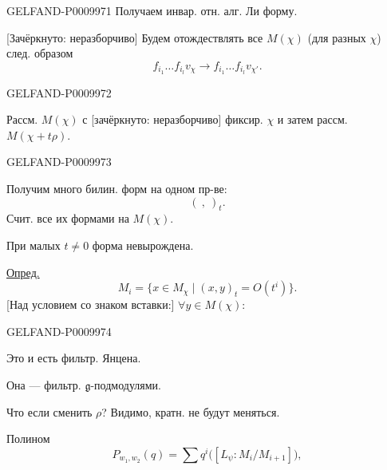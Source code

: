 \begin{GelfandAdjacentEvidence}{GELFAND-P000997}{1}
Получаем инвар. отн. алг. Ли форму.

[Зачёркнуто: неразборчиво] Будем отождествлять все $M(\chi)$ (для разных $\chi$) след. образом
\[
f_{i_1}\ldots f_{i_l}v_\chi
\longrightarrow f_{i_1}\ldots f_{i_l}v_{\chi'}.
\]
\end{GelfandAdjacentEvidence}
\begin{GelfandAdjacentEvidence}{GELFAND-P000997}{2}


Рассм. $M(\chi)$ с [зачёркнуто: неразборчиво] фиксир. $\chi$ и затем рассм. $M(\chi+t\rho)$.
\end{GelfandAdjacentEvidence}
\begin{GelfandAdjacentEvidence}{GELFAND-P000997}{3}


Получим много билин. форм на одном пр-ве:
\[
(\ ,\ )_t.
\]
Счит. все их формами на $M(\chi)$.

При малых $t\ne0$ форма невырождена.

\underline{Опред.}
\[
M_i=\{x\in M_\chi\mid (x,y)_t=O(t^i)\}.
\]
[Над условием со знаком вставки:] $\forall y\in M(\chi):$
\end{GelfandAdjacentEvidence}
\begin{GelfandAdjacentEvidence}{GELFAND-P000997}{4}


Это и есть фильтр. Янцена.

Она --- фильтр. $\mathfrak g$-подмодулями.

Что если сменить $\rho$? Видимо, кратн. не будут меняться.

Полином
\[
P_{w_1,w_2}(q)=\sum q^i\bigl([L_\psi:M_i/M_{i+1}]\bigr),
\]
\end{GelfandAdjacentEvidence}
